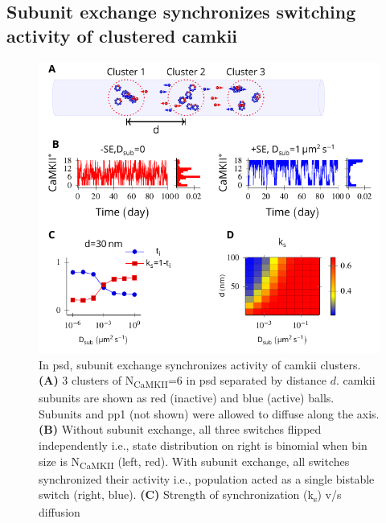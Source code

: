 \documentclass[9pt,lineno,doublespacing]{elife}
\newcommand\SUB[2]{#1\textsubscript{#2}}
\begin{document}
\begin{figure}
\label{figsupp:diffusion_reduces_pp1_potency}
\end{figure}



\subsection{Subunit exchange synchronizes switching activity of clustered \gls{camkii}}\label{subsec:se_sync_switches}

\begin{figure}%
    \includegraphics[width=114mm]{./PaperFigures/elifeFigure5/figure_sync_114mm.pdf}
    \caption{In \gls{psd}, subunit exchange synchronizes activity of
        \gls{camkii} clusters. \textbf{(A)} 3 clusters of
        N\textsubscript{CaMKII}=6 in \gls{psd} separated by distance \(d\).
        \gls{camkii} subunits are shown as red (inactive) and blue (active)
        balls.  Subunits and \gls{pp1} (not shown) were allowed to diffuse along
        the axis. \textbf{(B)} Without subunit exchange, all three switches
        flipped independently i.e., state distribution on right is binomial when bin size is \SUB{N}{CaMKII}
        (left, red). With subunit exchange, all switches synchronized their activity
        i.e., population acted as a single bistable switch (right, blue).  \textbf{(C)}
        Strength of synchronization (k\textsubscript{s}) v/s diffusion
}
\end{figure}
\end{document}

